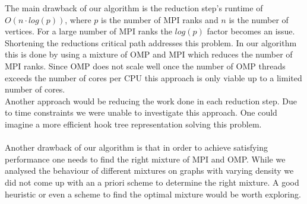 The main drawback of our algorithm is the reduction step's runtime of $O\left(n \cdot log\left(p\right)\right)$, where $p$ is the number of MPI ranks and $n$ is the number of vertices. For a large number of MPI ranks the $log\left(p\right)$ factor becomes an issue.\\
Shortening the reductions critical path addresses this problem. In our algorithm this is done by using a mixture of OMP and MPI which reduces the number of MPI ranks. Since OMP does not scale well once the number of OMP threads exceeds the number of cores per CPU this approach is only viable up to a limited number of cores.\\
Another approach would be reducing the work done in each reduction step. Due to time constraints we were unable to investigate this approach. One could imagine a more efficient hook tree representation solving this problem.\\
\\
Another drawback of our algorithm is that in order to achieve satisfying performance one needs to find the right mixture of MPI and OMP. While we analysed the behaviour of different mixtures on graphs with varying density we did not come up with an a priori scheme to determine the right mixture. A good heuristic or even a scheme to find the optimal mixture would be worth exploring.